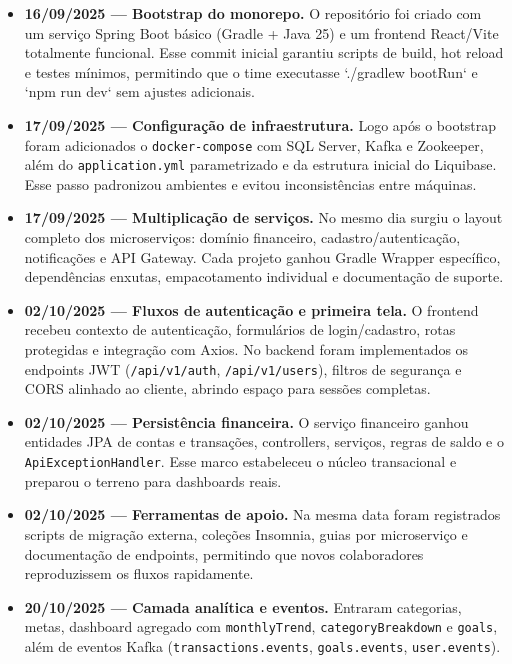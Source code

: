 \begin{itemize}
    \item \textbf{16/09/2025 — Bootstrap do monorepo.} O repositório foi criado com um serviço Spring Boot básico (Gradle + Java 25) e um frontend React/Vite totalmente funcional. Esse commit inicial garantiu scripts de build, hot reload e testes mínimos, permitindo que o time executasse `./gradlew bootRun` e `npm run dev` sem ajustes adicionais.

    \item \textbf{17/09/2025 — Configuração de infraestrutura.} Logo após o bootstrap foram adicionados o \texttt{docker-compose} com SQL Server, Kafka e Zookeeper, além do \texttt{application.yml} parametrizado e da estrutura inicial do Liquibase. Esse passo padronizou ambientes e evitou inconsistências entre máquinas.

    \item \textbf{17/09/2025 — Multiplicação de serviços.} No mesmo dia surgiu o layout completo dos microserviços: domínio financeiro, cadastro/autenticação, notificações e API Gateway. Cada projeto ganhou Gradle Wrapper específico, dependências enxutas, empacotamento individual e documentação de suporte.

    \item \textbf{02/10/2025 — Fluxos de autenticação e primeira tela.} O frontend recebeu contexto de autenticação, formulários de login/cadastro, rotas protegidas e integração com Axios. No backend foram implementados os endpoints JWT (\texttt{/api/v1/auth}, \texttt{/api/v1/users}), filtros de segurança e CORS alinhado ao cliente, abrindo espaço para sessões completas.

    \item \textbf{02/10/2025 — Persistência financeira.} O serviço financeiro ganhou entidades JPA de contas e transações, controllers, serviços, regras de saldo e o \texttt{ApiExceptionHandler}. Esse marco estabeleceu o núcleo transacional e preparou o terreno para dashboards reais.

    \item \textbf{02/10/2025 — Ferramentas de apoio.} Na mesma data foram registrados scripts de migração externa, coleções Insomnia, guias por microserviço e documentação de endpoints, permitindo que novos colaboradores reproduzissem os fluxos rapidamente.

    \item \textbf{20/10/2025 — Camada analítica e eventos.} Entraram categorias, metas, dashboard agregado com \texttt{monthlyTrend}, \texttt{categoryBreakdown} e \texttt{goals}, além de eventos Kafka (\texttt{transactions.events}, \texttt{goals.events}, \texttt{user.events}).


\end{itemize}
